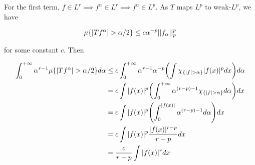 \documentclass{report}
\begin{document}
For the first term, $f \in L^r \implies f^\alpha \in L^r \implies f^\alpha \in L^p$. As $T$ maps $L^p$ to weak-$L^p$, we have

\[
    \mu \{|Tf^\alpha| > \alpha/2\} \leq c \alpha^{-p} ||f_\alpha||_p^p
\]

for some constant $c$. Then

\begin{align*}
    \int_0^{+\infty} \alpha^{r-1} \mu \set{|Tf^\alpha| > \alpha/2} d\alpha
    &\leq c \int_0^{+\infty} \alpha^{r-1} \alpha^{-p} \tuple*{\int \chi_{\set{|f| > \alpha}} |f(x)|^p dx} d\alpha \\
    &= c \int |f(x)|^p \tuple*{\int_0^{+\infty} \alpha^{(r-p)-1} \chi_{\set{|f| > \alpha}} d\alpha } dx \\
    &= c \int |f(x)|^p \tuple*{\int_0^{|f(x)|} \alpha^{(r-p)-1} d\alpha } dx \\
    &= c \int |f(x)|^p \frac{|f(x)|^{r-p}}{r-p} dx \\
    &= \frac{c}{r-p} \int |f(x)|^r dx
\end{align*}
\end{document}
